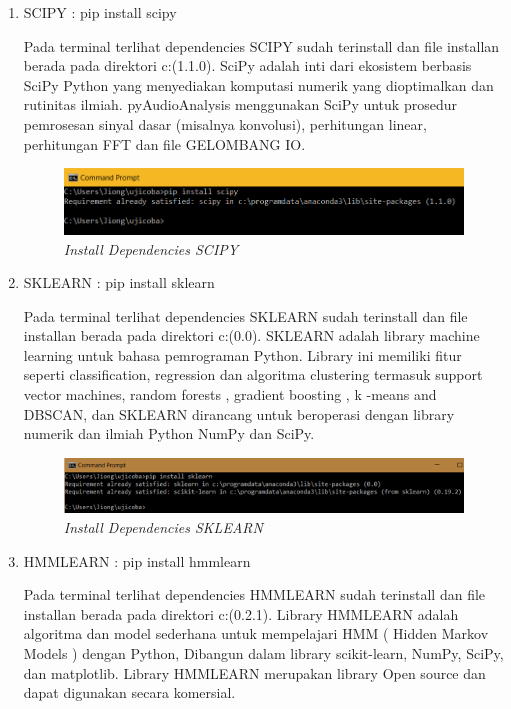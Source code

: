\begin{enumerate}
    
    \item SCIPY  : pip install scipy
    \par\hspace{1cm} Pada terminal terlihat dependencies SCIPY sudah terinstall dan file installan berada pada direktori c:\programdata{}\lib\sitepackages (1.1.0). SciPy adalah inti dari ekosistem berbasis SciPy Python yang menyediakan komputasi numerik yang dioptimalkan dan rutinitas ilmiah. pyAudioAnalysis menggunakan SciPy untuk prosedur pemrosesan sinyal dasar (misalnya konvolusi), perhitungan linear, perhitungan FFT dan file GELOMBANG IO. 
 
    \begin{figure} [htbp]
    \centering
    \includegraphics[scale=0.5] {figures/image015.png}
    \caption{\textit{ Install Dependencies SCIPY   }}
    \end{figure}
    
    \item SKLEARN   : pip install sklearn 
    \par\hspace{1cm} Pada terminal terlihat dependencies SKLEARN sudah terinstall dan file installan berada pada direktori c:\programdata{}\lib\sitepackages (0.0). SKLEARN adalah library  machine learning untuk bahasa pemrograman Python. Library  ini memiliki fitur seperti classification, regression dan algoritma clustering termasuk support vector machines, random forests , gradient boosting , k -means and DBSCAN, dan SKLEARN  dirancang untuk beroperasi dengan library  numerik dan ilmiah Python NumPy dan SciPy. 
 
    \begin{figure} [htbp]
    \centering
    \includegraphics[scale=0.4] {figures/image017.png}
    \caption{\textit{ Install Dependencies SKLEARN   }}
    \end{figure}
    
     
    \item HMMLEARN    : pip install hmmlearn  
    \par\hspace{1cm} Pada terminal terlihat dependencies HMMLEARN sudah terinstall dan file installan berada pada direktori c:\programdata{}\lib\sitepackages (0.2.1). Library  HMMLEARN adalah algoritma dan model sederhana untuk mempelajari HMM ( Hidden Markov Models ) dengan Python, Dibangun dalam library  scikit-learn, NumPy, SciPy, dan matplotlib. Library  HMMLEARN merupakan library  Open source dan dapat digunakan secara komersial.
 

\end{enumerate}
